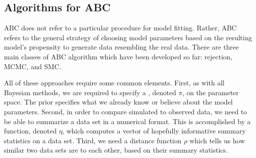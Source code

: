%
%

\subsection{Algorithms for ABC}
\label{subsubsec:abcalg}

\Gls{ABC} does not refer to a particular procedure for model fitting. Rather,
\gls{ABC} refers to the general strategy of choosing model parameters based on
the resulting model's propensity to generate data resembling the real data.
There are three main classes of \gls{ABC} algorithm which have been developed
so far: rejection, \gls{MCMC}, and \gls{SMC}.

All of these approaches require some common elements. First, as with all
Bayesian methods, we are required to specify a ,
denoted $\pi$, on the parameter space. The prior specifies what we already know
or believe about the model parameters. Second, in order to compare simulated to
observed data, we need to be able to summarize a data set in a numerical
format. This is accomplished by a function, denoted $\eta$, which computes a
vector of hopefully informative summary statistics on a data set. Third, we
need a distance function $\rho$ which tells us how similar two data sets are to
each other, based on their summary statistics.

